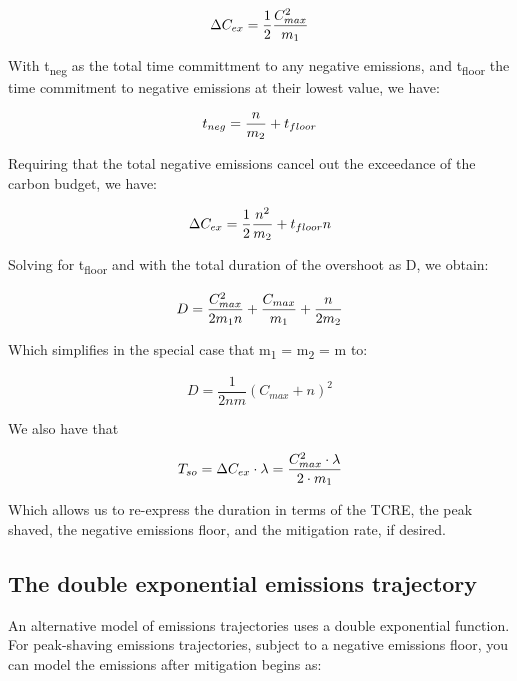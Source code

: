 \documentclass[draft]{agujournal2019}
\begin{document}
\begin{equation}
\Delta C_{ex} = \frac{1}{2} \frac{C^{2}_{max}}{m\textsubscript{1}}   
\end{equation}

With t\textsubscript{neg} as the total time committment to any negative emissions, and t\textsubscript{floor} the time commitment to negative emissions at their lowest value, we have:

\begin{equation}
 t_{neg} = \frac{n}{m\textsubscript{2}} + t_{floor} 
\end{equation}

Requiring that the total negative emissions cancel out the exceedance of the carbon budget, we have:

\begin{equation}
 \Delta C_{ex} = \frac{1}{2} \frac{n^{2}}
{m\textsubscript{2}} + t_{floor} n   
\end{equation}

Solving for t\textsubscript{floor} and with the total duration of the overshoot as D, we obtain:


\begin{equation}
 D = \frac{C^{2}_{max}}{2m\textsubscript{1} n} + \frac{C_{max}}{m\textsubscript{1}} + \frac{n}{2m\textsubscript{2}}
\end{equation}


Which simplifies in the special case that m\textsubscript{1} = m\textsubscript{2} = m to:


\begin{equation}
D = \frac{1}{2nm} (C_{max} + n)^2 
\end{equation}

We also have that


\begin{equation}
 T_{so} = \Delta C_{ex} \cdot \lambda  = \frac{C^{2}_{max}\cdot \lambda}{2  \cdot m\textsubscript{1}} 
\end{equation}


\medskip

Which allows us to re-express the duration in terms of the TCRE, the peak shaved, the negative emissions floor, and the mitigation rate, if desired.

\subsection{The double exponential emissions trajectory}

An alternative model of emissions trajectories uses a double exponential function. For peak-shaving emissions trajectories, subject to  a negative emissions floor, you can model the emissions after mitigation begins as:
\end{document}
